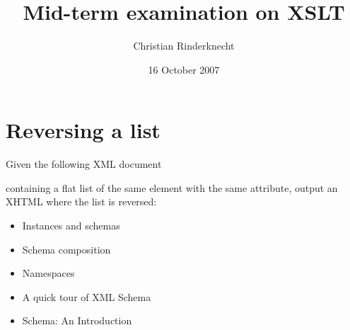 \documentclass[11pt,a4paper]{article}
\title{Mid-term examination on XSLT}
\author{Christian Rinderknecht}
\date{16 October 2007}
\newcommand\XML{\textsf{XML}\xspace}
\newcommand\XHTML{\textsf{XHTML}\xspace}
\begin{document}
\maketitle

\thispagestyle{empty}

\section{Reversing a list}

Given the following \XML document


\noindent containing a flat list of the same element with the same
attribute, output an \XHTML where the list is reversed:
\begin{itemize}

  \item Instances and schemas

  \item Schema composition

  \item Namespaces

  \item A quick tour of XML Schema

  \item Schema: An Introduction

\end{itemize}
\end{document}
